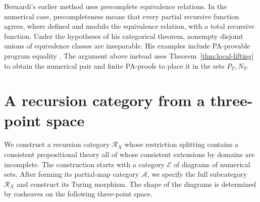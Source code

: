 \documentclass[11pt]{article}
\begin{document}
Bernardi's earlier method uses precomplete equivalence relations.
In the numerical case, precompleteness means that every partial
recursive function agrees, where defined and modulo the equivalence
relation, with a total recursive function. Under the hypotheses of
his categorical theorem, nonempty disjoint unions of equivalence
classes are inseparable. His examples include PA-provable program
equality \cite[pp.~125--128]{Bernardi}. The argument above instead
uses Theorem~\ref{thm:local-lifting} to obtain the numerical pair and
finite PA-proofs to place it in the sets $P_T,N_T$.

\section{A recursion category from a three-point space}\label{sec:cosheaves}

We construct a recursion category $\mathscr R_X$ whose restriction
splitting contains a consistent propositional theory all of whose
consistent extensions by domains are incomplete. The construction
starts with a category $\mathcal E$ of diagrams of numerical sets.
After forming its partial-map category $\mathcal A$, we specify the
full subcategory $\mathscr R_X$ and construct its Turing morphism.
The shape of the diagrams is determined by cosheaves on the following
three-point space.
\end{document}
